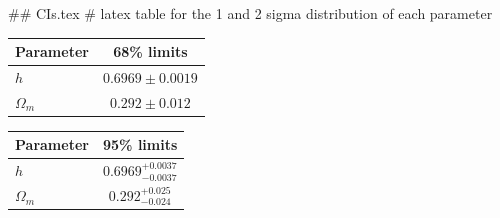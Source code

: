 ## CIs.tex
# latex table for the 1 and 2 sigma distribution of each parameter

\begin{tabular} { l  c}
 Parameter &  68\% limits\\
\hline
{\boldmath$h              $} & $0.6969\pm 0.0019          $\\
{\boldmath$\Omega_m       $} & $0.292\pm 0.012            $\\
\hline
\end{tabular}

\begin{tabular} { l  c}
 Parameter &  95\% limits\\
\hline
{\boldmath$h              $} & $0.6969^{+0.0037}_{-0.0037}$\\
{\boldmath$\Omega_m       $} & $0.292^{+0.025}_{-0.024}   $\\
\hline
\end{tabular}
